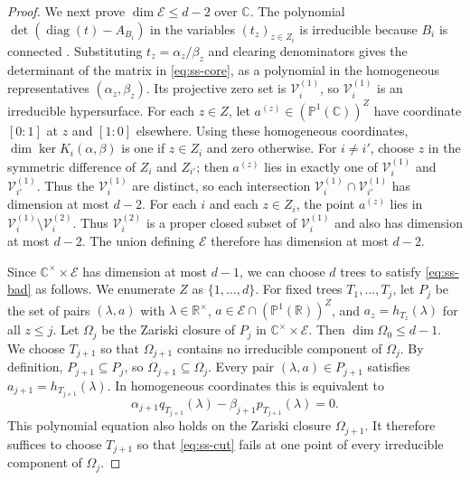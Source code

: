 \documentclass[10pt,a4paper]{article}
\theoremstyle{plain}
\theoremstyle{definition}
\DeclareMathOperator{\diag}{diag}
\newcommand{\R}{\mathbb{R}}
\begin{document}
\begin{proof}
We next prove $\dim\mathcal E\le d-2$ over $\mathbb C$.
The polynomial $\det(\diag(t)-A_{B_i})$ in the variables $(t_z)_{z\in Z_i}$
is irreducible because $B_i$ is connected
\cite[Lemma~4.1]{AlAhmadieh2026}.
Substituting $t_z=\alpha_z/\beta_z$ and clearing denominators gives the
determinant of the matrix in \cref{eq:ss-core}, as a polynomial in the
homogeneous representatives $(\alpha_z,\beta_z)$.
Its projective zero set is $\mathcal V_i^{(1)}$, so
$\mathcal V_i^{(1)}$ is an irreducible hypersurface.
For each $z\in Z$, let $a^{(z)}\in(\mathbb P^1(\mathbb C))^Z$ have
coordinate $[0:1]$ at $z$ and $[1:0]$ elsewhere.
Using these homogeneous coordinates, $\dim\ker K_i(\alpha,\beta)$ is one
if $z\in Z_i$ and zero otherwise.
For $i\ne i'$, choose $z$ in the symmetric difference of $Z_i$ and
$Z_{i'}$; then $a^{(z)}$ lies in exactly one of $\mathcal V_i^{(1)}$ and
$\mathcal V_{i'}^{(1)}$.
Thus the $\mathcal V_i^{(1)}$ are distinct, so each intersection
$\mathcal V_i^{(1)}\cap \mathcal V_{i'}^{(1)}$ has dimension at most $d-2$.
For each $i$ and each $z\in Z_i$, the point $a^{(z)}$ lies in
$\mathcal V_i^{(1)}\setminus\mathcal V_i^{(2)}$.
Thus $\mathcal V_i^{(2)}$ is a proper closed subset of
$\mathcal V_i^{(1)}$ and also has dimension at most $d-2$.
The union defining $\mathcal E$ therefore has dimension at most $d-2$.

Since $\mathbb C^\times\times\mathcal E$ has dimension at most $d-1$,
we can choose $d$ trees to satisfy \cref{eq:ss-bad} as follows.
We enumerate $Z$ as $\{1,\ldots,d\}$.
For fixed trees $T_1,\ldots,T_j$, let $P_j$ be the set of pairs
$(\lambda,a)$ with $\lambda\in\R^\times$,
$a\in\mathcal E\cap(\mathbb P^1(\R))^Z$, and
$a_z=h_{T_z}(\lambda)$ for all $z\le j$.
Let $\Omega_j$ be the Zariski closure of $P_j$ in
$\mathbb C^\times\times\mathcal E$.
Then $\dim\Omega_0\le d-1$.
We choose $T_{j+1}$ so that $\Omega_{j+1}$ contains no irreducible
component of $\Omega_j$.
By definition, $P_{j+1}\subseteq P_j$, so $\Omega_{j+1}\subseteq\Omega_j$.
Every pair $(\lambda,a)\in P_{j+1}$ satisfies
$a_{j+1}=h_{T_{j+1}}(\lambda)$. In homogeneous coordinates this is
equivalent to
\begin{equation}\label{eq:ss-cut}
 \alpha_{j+1}q_{T_{j+1}}(\lambda)-\beta_{j+1}p_{T_{j+1}}(\lambda)=0.
\end{equation}
This polynomial equation also holds on the Zariski closure
$\Omega_{j+1}$.
It therefore suffices to choose $T_{j+1}$ so that \cref{eq:ss-cut}
fails at one point of every irreducible component of $\Omega_j$.


\end{proof}
\end{document}
